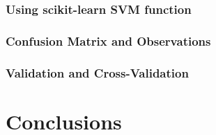 \documentclass[12pt,a4paper]{article}
\begin{document}
\subsubsection{Using scikit-learn SVM function}

\subsubsection{Confusion Matrix and Observations}

\subsubsection{Validation and Cross-Validation}

\section*{Conclusions}
\end{document}
